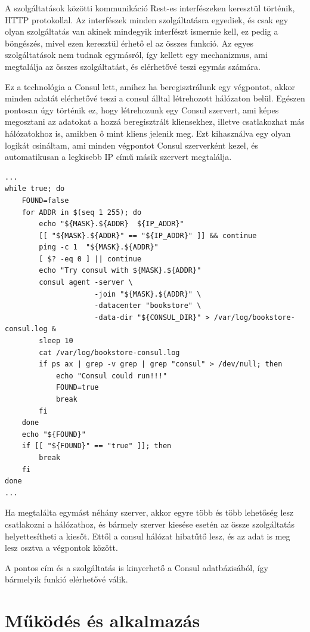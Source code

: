 \documentclass[11pt,magyar,a4paper,twoside,]{report}
\begin{document}
A szolgáltatások közötti kommunikáció Rest-es interfészeken keresztül
történik, HTTP protokollal. Az interfészek minden szolgáltatásra
egyediek, és csak egy olyan szolgáltatás van akinek mindegyik interfészt
ismernie kell, ez pedig a böngészés, mivel ezen keresztül érhető el az
összes funkció. Az egyes szolgáltatások nem tudnak egymásról, így
kellett egy mechanizmus, ami megtalálja az összes szolgáltatást, és
elérhetővé teszi egymás számára.

Ez a technológia a Consul lett, amihez ha beregisztrálunk egy végpontot,
akkor minden adatát elérhetővé teszi a consul álltal létrehozott
hálózaton belül. Egészen pontosan úgy történik ez, hogy létrehozunk egy
Consul szervert, ami képes megosztani az adatokat a hozzá beregisztrált
kliensekhez, illetve csatlakozhat más hálózatokhoz is, amikben ő mint
kliens jelenik meg. Ezt kihasználva egy olyan logikát csináltam, ami
minden végpontot Consul szerverként kezel, és automatikusan a legkisebb
IP című másik szervert megtalálja.

\begin{verbatim}
...
while true; do
    FOUND=false
    for ADDR in $(seq 1 255); do
        echo "${MASK}.${ADDR}  ${IP_ADDR}"
        [[ "${MASK}.${ADDR}" == "${IP_ADDR}" ]] && continue
        ping -c 1  "${MASK}.${ADDR}"
        [ $? -eq 0 ] || continue
        echo "Try consul with ${MASK}.${ADDR}"
        consul agent -server \
                     -join "${MASK}.${ADDR}" \
                     -datacenter "bookstore" \
                     -data-dir "${CONSUL_DIR}" > /var/log/bookstore-consul.log &
        sleep 10
        cat /var/log/bookstore-consul.log
        if ps ax | grep -v grep | grep "consul" > /dev/null; then
            echo "Consul could run!!!"
            FOUND=true
            break
        fi
    done
    echo "${FOUND}"
    if [[ "${FOUND}" == "true" ]]; then
        break
    fi
done
...
\end{verbatim}

Ha megtalálta egymást néhány szerver, akkor egyre több és több lehetőség
lesz csatlakozni a hálózathoz, és bármely szerver kiesése esetén az
össze szolgáltatás helyettesítheti a kiesőt. Ettől a consul hálózat
hibatűtő lesz, és az adat is meg lesz osztva a végpontok között.

A pontos cím és a szolgáltatás is kinyerhető a Consul adatbázisából, így
bármelyik funkió elérhetővé válik.

\section{Működés és
alkalmazás}\label{mux171kuxf6duxe9s-uxe9s-alkalmazuxe1s}
\end{document}
